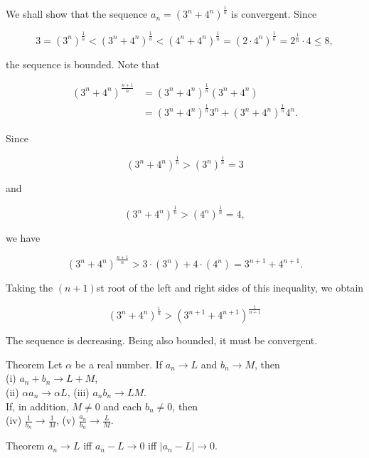         \textit{} We shall show that the sequence $a_n = \left(3^n + 4^n\right)^{\frac{1}{n}}$ is convergent. Since

        \[
            3 = (3^n)^{\frac{1}{n}} < (3^n + 4^n)^{\frac{1}{n}} < (4^n + 4^n)^{\frac{1}{n}} = (2\cdot 4^n)^{\frac{1}{n}} = 2^{\frac{1}{n}}\cdot 4 \leq 8,
        \]

        the sequence is bounded. Note that

        \begin{align*}
            (3^n + 4^n)^{\frac{n+1}{n}} &= (3^n + 4^n)^{\frac{1}{n}}(3^n + 4^n) \\
                                        &= (3^n + 4^n)^{\frac{1}{n}} 3^n + (3^n + 4^n)^{\frac{1}{n}}4^n.
        \end{align*}

        Since

        \[
            (3^n + 4^n)^{\frac{1}{n}} > (3^n)^{\frac{1}{n}} = 3
        \]

        and

        \[
            (3^n + 4^n)^{\frac{1}{n}} > (4^n)^{\frac{1}{n}} = 4,
        \]

        we have

        \[
            (3^n + 4^n)^{\frac{n+1}{n}} > 3\cdot (3^n) + 4\cdot (4^n) = 3^{n+1} + 4^{n+1}.
        \]

        Taking the $(n+1)$st root of the left and right sides of this inequality, we obtain

        \[
            (3^n + 4^n)^{\frac{1}{n}} > (3^{n+1} + 4^{n+1})^{\frac{1}{n+1}}
        \]

        The sequence is decreasing. Being also bounded, it must be convergent.

        \begin{theorem}{Theorem}
            Let $\alpha$ be a real number. If $a_n \to L$ and $b_n \to M$, then \\
            (i) $a_n + b_n \to L + M$, \\
            (ii) $\alpha a_n \to\alpha L$,
            (iii) $a_n b_n \to LM$. \\

            If, in addition, $M\not = 0$ and each $b_n \not = 0$, then \\
            (iv) $\frac{1}{b_n} \to \frac{1}{M}$,
            (v) $\frac{a_n}{b_n} \to \frac{L}{M}$.
        \end{theorem}

        \begin{theorem}{Theorem}
            $a_n \to L$ iff $a_n - L \to 0$ iff $|a_n - L| \to 0$.
        \end{theorem}

